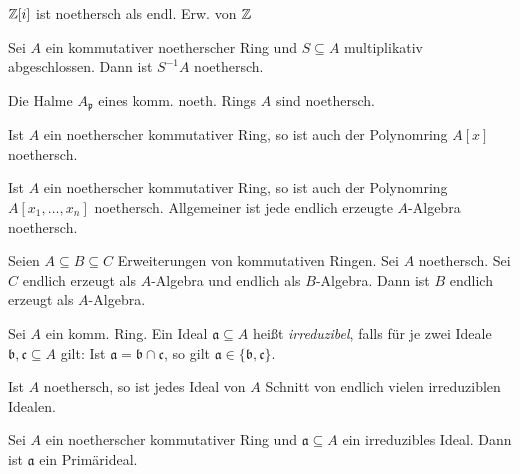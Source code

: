 \documentclass{cheat-sheet}
\newcommand{\aaa}{\mathfrak{a}}
\newcommand{\bbb}{\mathfrak{b}}
\newcommand{\ccc}{\mathfrak{c}}
\newcommand{\ppp}{\mathfrak{p}}
\begin{document}
\begin{bsp}
  $\mathbb{Z}[i]$ ist noethersch als endl. Erw. von $\mathbb{Z}$
\end{bsp}

\begin{prop}
  Sei $A$ ein kommutativer noetherscher Ring und $S \subseteq A$ multiplikativ abgeschlossen.
  Dann ist $S^{-1} A$ noethersch.
\end{prop}

\begin{kor}
  Die Halme $A_\ppp$ eines komm. noeth. Rings $A$ sind noethersch.
\end{kor}


\begin{satz}
  Ist $A$ ein noetherscher kommutativer Ring, so ist auch der Polynomring $A[x]$ noethersch.
\end{satz}

\begin{kor}
  Ist $A$ ein noetherscher kommutativer Ring, so ist auch der Polynomring $A[x_1, \ldots, x_n]$ noethersch.
  Allgemeiner ist jede endlich erzeugte $A$-Algebra noethersch.
\end{kor}

\begin{prop}
  Seien $A \subseteq B \subseteq C$ Erweiterungen von kommutativen Ringen.
  Sei $A$ noethersch.
  Sei $C$ endlich erzeugt als $A$-Algebra und endlich als $B$-Algebra.
  Dann ist $B$ endlich erzeugt als $A$-Algebra.
\end{prop}



\begin{defn}
  Sei $A$ ein komm. Ring.
  Ein Ideal $\aaa \subseteq A$ heißt \emph{irreduzibel}, falls für je zwei Ideale $\bbb, \ccc \subseteq A$ gilt: \enspace
  Ist $\aaa = \bbb \cap \ccc$, so gilt $\aaa \in \{ \bbb, \ccc \}$.
\end{defn}

\begin{lem}
  Ist $A$ noethersch, so ist jedes Ideal von $A$ Schnitt von endlich vielen irreduziblen Idealen.
\end{lem}

\begin{lem}
  Sei $A$ ein noetherscher kommutativer Ring und $\aaa \subseteq A$ ein irreduzibles Ideal.
  Dann ist $\aaa$ ein Primärideal.
\end{lem}
\end{document}
